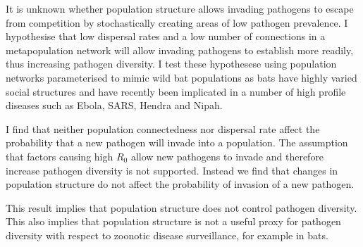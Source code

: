 It is unknown whether population structure allows invading pathogens to escape from competition by stochastically creating areas of low pathogen prevalence.
I hypothesise that low dispersal rates and a low number of connections in a metapopulation network will allow invading pathogens to establish more readily, thus increasing pathogen diversity. 
I test these hypothesese using population networks parameterised to mimic wild bat populations as bats have highly varied social structures and have recently been implicated in a number of high profile diseases such as Ebola, SARS, Hendra and Nipah.

I find that neither population connectedness nor dispersal rate affect the probability that a new pathogen will invade into a population.
The assumption that factors causing high $R_0$ allow new pathogens to invade and therefore increase pathogen diversity is not supported.
Instead we find that changes in population structure do not affect the probability of invasion of a new pathogen.


This result implies that population structure does not control pathogen diversity.
This also implies that population structure is not a useful proxy for pathogen diversity with respect to zoonotic disease surveillance, for example in bats.







